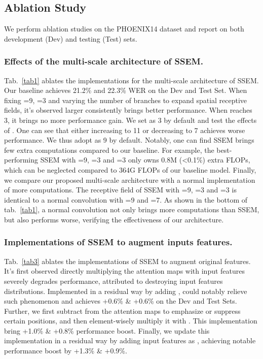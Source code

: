 \documentclass[letterpaper]{article} \usepackage{aaai23}  \usepackage{times}  \usepackage{helvet}  \usepackage{courier}  \usepackage[hyphens]{url}  \usepackage{graphicx} \urlstyle{rm} \def\UrlFont{\rm}  \usepackage{natbib}  \usepackage{caption} \frenchspacing  \setlength{\pdfpagewidth}{8.5in} \setlength{\pdfpageheight}{11in} \usepackage{algorithm}
\begin{document}
\subsection{Ablation Study}
We perform ablation studies on the PHOENIX14 dataset and report on both development (Dev) and testing (Test) sets. 

\subsubsection{Effects of the multi-scale architecture of SSEM.}
Tab.~\ref{tab1} ablates the implementations for the multi-scale architecture of SSEM. Our baseline achieves 21.2\% and 22.3\% WER on the Dev and Test Set. When fixing =9, =3 and varying the number of branches to expand spatial receptive fields, it's observed larger  consistently brings better performance. When  reaches 3, it brings no more performance gain. We set  as 3 by default and test the effects of . One can see that either increasing  to 11 or decreasing  to 7 achieves worse performance. We thus adopt  as 9 by default. Notably, one can find SSEM brings few extra computations compared to our baseline. For example, the best-performing SSEM with =9, =3 and =3 only owns 0.8M (\textless 0.1\%) extra FLOPs, which can be neglected compared to 364G FLOPs of our baseline model. Finally, we compare our proposed multi-scale architecture with a normal implementation of more computations. The receptive field of SSEM with =9, =3 and =3 is identical to a normal convolution with =9 and =7. As shown in the bottom of tab.~\ref{tab1}, a normal convolution not only brings more computations than SSEM, but also performs worse, verifying the effectiveness of our architecture. 

\subsubsection{Implementations of SSEM to augment inputs features.} Tab.~\ref{tab3} ablates the implementations of SSEM to augment original features. It's first observed directly multiplying the attention maps  with input features  severely degrades performance, attributed to destroying input features distributions. Implemented in a residual way by adding ,  could notably relieve such phenomenon and achieves +0.6\% \& +0.6\% on the Dev and Test Sets. Further, we first subtract  from the attention maps  to emphasize or suppress certain positions, and then element-wisely multiply it with . This implementation bring +1.0\% \& +0.8\% performance boost. Finally, we update this implementation in a residual way by adding input features  as , achieving notable performance boost by +1.3\% \& +0.9\%.
\end{document}
